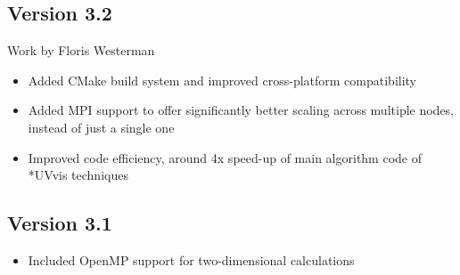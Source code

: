 	\subsection{Version 3.2}
{\small Work by Floris Westerman}
\begin{itemize}
\item Added CMake build system and improved cross-platform compatibility
\item Added MPI support to offer significantly better scaling across multiple nodes, instead of just a single one
\item Improved code efficiency, around 4x speed-up of main algorithm code of *UVvis techniques
\end{itemize}

\subsection{Version 3.1}
\begin{itemize}
\item Included OpenMP support for two-dimensional calculations
\end{itemize}